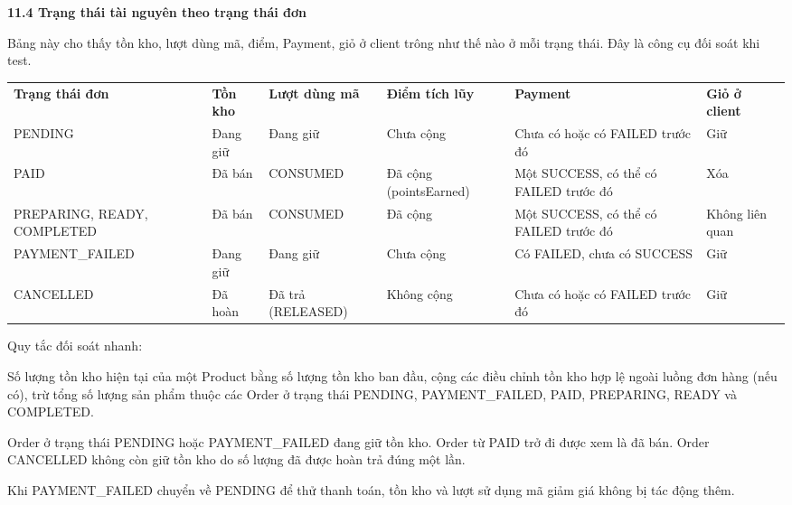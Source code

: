 \documentclass[11pt,a4paper,oneside]{report}
\begin{document}
\textbf{11.4 Trạng thái tài nguyên theo trạng thái đơn}

Bảng này cho thấy tồn kho, lượt dùng mã, điểm, Payment, giỏ ở client trông như thế nào ở mỗi trạng thái. Đây là công cụ đối soát khi test.

\begin{longtable}[]{@{}
  >{\raggedright\arraybackslash}p{}
  >{\raggedright\arraybackslash}p{}
  >{\raggedright\arraybackslash}p{}
  >{\raggedright\arraybackslash}p{}
  >{\raggedright\arraybackslash}p{}
  >{\raggedright\arraybackslash}p{}@{}}
\toprule\noalign{}
\endhead
\bottomrule\noalign{}
\endlastfoot
\textbf{Trạng thái đơn} & \textbf{Tồn kho} & \textbf{Lượt dùng mã} & \textbf{Điểm tích lũy} & \textbf{Payment} & \textbf{Giỏ ở client} \\
PENDING & Đang giữ & Đang giữ & Chưa cộng & Chưa có hoặc có FAILED trước đó & Giữ \\
PAID & Đã bán & CONSUMED & Đã cộng (pointsEarned) & Một SUCCESS, có thể có FAILED trước đó & Xóa \\
PREPARING, READY, COMPLETED & Đã bán & CONSUMED & Đã cộng & Một SUCCESS, có thể có FAILED trước đó & Không liên quan \\
PAYMENT\_FAILED & Đang giữ & Đang giữ & Chưa cộng & Có FAILED, chưa có SUCCESS & Giữ \\
CANCELLED & Đã hoàn & Đã trả (RELEASED) & Không cộng & Chưa có hoặc có FAILED trước đó & Giữ \\
\end{longtable}

Quy tắc đối soát nhanh:

Số lượng tồn kho hiện tại của một Product bằng số lượng tồn kho ban đầu, cộng các điều chỉnh tồn kho hợp lệ ngoài luồng đơn hàng (nếu có), trừ tổng số lượng sản phẩm thuộc các Order ở trạng thái PENDING, PAYMENT\_FAILED, PAID, PREPARING, READY và COMPLETED.

Order ở trạng thái PENDING hoặc PAYMENT\_FAILED đang giữ tồn kho. Order từ PAID trở đi được xem là đã bán. Order CANCELLED không còn giữ tồn kho do số lượng đã được hoàn trả đúng một lần.

Khi PAYMENT\_FAILED chuyển về PENDING để thử thanh toán, tồn kho và lượt sử dụng mã giảm giá không bị tác động thêm.
\end{document}
